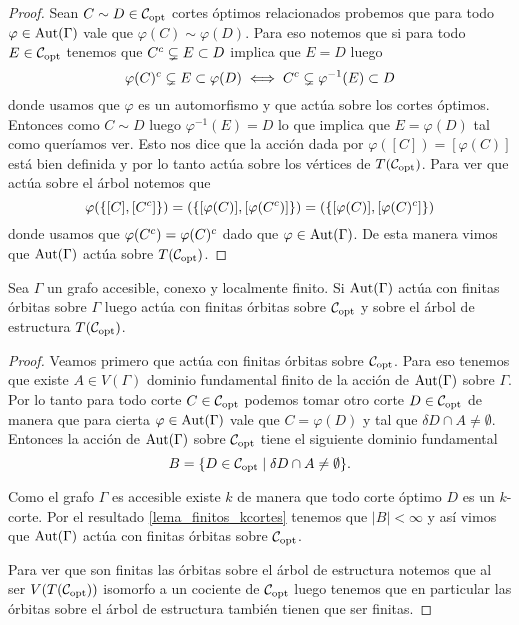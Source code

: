 \documentclass[tesis.tex]{subfiles}
\begin{document}
\begin{proof}
	Sean $C \sim D \in {\cal C}_{\text{opt}}$ cortes óptimos relacionados probemos que para todo $\varphi \in \text{Aut}(\Gamma)$ vale que $\varphi(C) \sim \varphi(D)$.
	Para eso notemos que si para todo $E \in {\cal C}_{\text{opt}}$ tenemos que 
	$C^{c} \subsetneq E \subset D$ implica que $E = D$ luego
	\[
	\varphi(C)^{c} \subsetneq E \subset \varphi(D) \iff C^{c} \subsetneq \varphi^{-1}(E) \subset D
	\]  
	donde usamos que $\varphi$ es un automorfismo y que actúa sobre los cortes óptimos.
	Entonces como $C \sim D$ luego $\varphi^{-1}(E) = D$ lo que implica que $E = \varphi(D)$ tal como queríamos ver.
	Esto nos dice que la acción dada por $\varphi([C]) = [\varphi (C)]$ está bien definida y por lo tanto actúa sobre los vértices de $T({\cal C}_{\text{opt}})$.
	Para ver que actúa sobre el árbol notemos que 
	\[
		\varphi(\{[C],[C^{c}]\}) = (\{[\varphi (C)], [\varphi (C^{c})]\}) = (\{[\varphi (C)], [\varphi (C)^{c}]\})
	\]
	donde usamos que $\varphi(C^{c}) = \varphi(C)^{c}$ dado que $\varphi \in \text{Aut}(\Gamma)$.
	De esta manera vimos que $\text{Aut}(\Gamma)$ actúa sobre $T({\cal C}_{\text{opt}})$.
	
\end{proof}


\begin{lema}\label{lema_finitas_orbitas}
	Sea $\Gamma$ un grafo accesible, conexo y localmente finito.
	Si $\text{Aut}(\Gamma)$ actúa con finitas órbitas sobre $\Gamma$ luego actúa con finitas órbitas sobre ${\cal C}_{\text{opt}}$ y sobre el árbol de estructura $T({\cal C}_{\text{opt}})$.
\end{lema} 
\begin{proof}
	Veamos primero que actúa con finitas órbitas sobre ${\cal C}_{\text{opt}}$.
	Para eso tenemos que existe $A \in V(\Gamma)$ dominio fundamental finito de la acción de $\text{Aut}(\Gamma)$ sobre $\Gamma$.
	Por lo tanto para todo corte $C \in {\cal C}_{\text{opt}}$ podemos tomar otro corte $D \in {\cal C}_{\text{opt}}$ de manera que para cierta $\varphi \in \text{Aut}(\Gamma)$ vale que $C  = \varphi(D)$ y tal que $\delta D \cap A \neq \emptyset$.
	Entonces la acción de $\text{Aut}(\Gamma)$ sobre ${\cal C}_{\text{opt}}$ tiene el siguiente dominio fundamental
	\[
		B = \{  D \in {\cal C}_{\text{opt}} \mid \delta D \cap A \neq \emptyset \}.
	\]
	
	Como el grafo $\Gamma$ es accesible existe $k$ de manera que todo corte óptimo $D$ es un $k$-corte.
	Por el resultado \ref{lema_finitos_kcortes} tenemos que $|B| < \infty$ y así vimos que $\text{Aut}(\Gamma)$ actúa con finitas órbitas sobre ${\cal C}_{\text{opt}}$. 
	
	Para ver que son finitas las órbitas sobre el árbol de estructura notemos que al ser $V(T({\cal C}_{\text{opt}}))$ isomorfo a un cociente de ${\cal C}_{\text{opt}}$ luego tenemos que en particular las órbitas sobre el árbol de estructura también tienen que ser finitas.
	
\end{proof}
\end{document}
